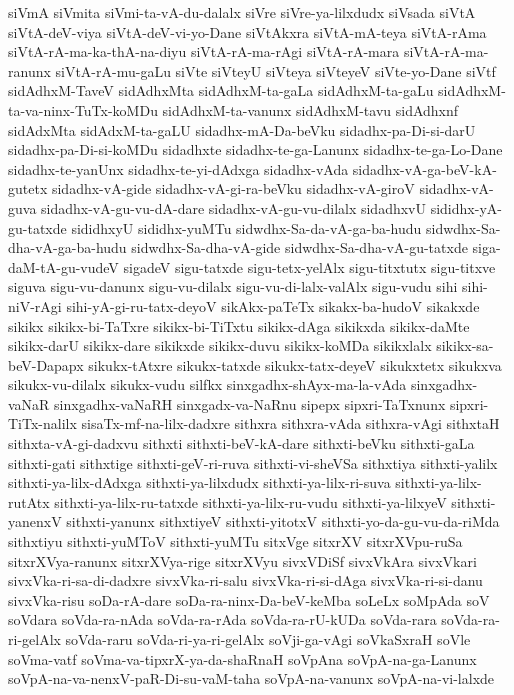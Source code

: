 {siVmA
siVmita
siVmi-ta-vA-du-dalalx
siVre
siVre-ya-lilxdudx
siVsada
siVtA
siVtA-deV-viya
siVtA-deV-vi-yo-Dane
siVtAkxra
siVtA-mA-teya
siVtA-rAma
siVtA-rA-ma-ka-thA-na-diyu
siVtA-rA-ma-rAgi
siVtA-rA-mara
siVtA-rA-ma-ranunx
siVtA-rA-mu-gaLu
siVte
siVteyU
siVteya
siVteyeV
siVte-yo-Dane
siVtf
sidAdhxM-TaveV
sidAdhxMta
sidAdhxM-ta-gaLa
sidAdhxM-ta-gaLu
sidAdhxM-ta-va-ninx-TuTx-koMDu
sidAdhxM-ta-vanunx
sidAdhxM-tavu
sidAdhxnf
sidAdxMta
sidAdxM-ta-gaLU
sidadhx-mA-Da-beVku
sidadhx-pa-Di-si-darU
sidadhx-pa-Di-si-koMDu
sidadhxte
sidadhx-te-ga-Lanunx
sidadhx-te-ga-Lo-Dane
sidadhx-te-yanUnx
sidadhx-te-yi-dAdxga
sidadhx-vAda
sidadhx-vA-ga-beV-kA-gutetx
sidadhx-vA-gide
sidadhx-vA-gi-ra-beVku
sidadhx-vA-giroV
sidadhx-vA-guva
sidadhx-vA-gu-vu-dA-dare
sidadhx-vA-gu-vu-dilalx
sidadhxvU
sididhx-yA-gu-tatxde
sididhxyU
sididhx-yuMTu
sidwdhx-Sa-da-vA-ga-ba-hudu
sidwdhx-Sa-dha-vA-ga-ba-hudu
sidwdhx-Sa-dha-vA-gide
sidwdhx-Sa-dha-vA-gu-tatxde
siga-daM-tA-gu-vudeV
sigadeV
sigu-tatxde
sigu-tetx-yelAlx
sigu-titxtutx
sigu-titxve
siguva
sigu-vu-danunx
sigu-vu-dilalx
sigu-vu-di-lalx-valAlx
sigu-vudu
sihi
sihi-niV-rAgi
sihi-yA-gi-ru-tatx-deyoV
sikAkx-paTeTx
sikakx-ba-hudoV
sikakxde
sikikx
sikikx-bi-TaTxre
sikikx-bi-TiTxtu
sikikx-dAga
sikikxda
sikikx-daMte
sikikx-darU
sikikx-dare
sikikxde
sikikx-duvu
sikikx-koMDa
sikikxlalx
sikikx-sa-beV-Dapapx
sikukx-tAtxre
sikukx-tatxde
sikukx-tatx-deyeV
sikukxtetx
sikukxva
sikukx-vu-dilalx
sikukx-vudu
silfkx
sinxgadhx-shAyx-ma-la-vAda
sinxgadhx-vaNaR
sinxgadhx-vaNaRH
sinxgadx-va-NaRnu
sipepx
sipxri-TaTxnunx
sipxri-TiTx-nalilx
sisaTx-mf-na-lilx-dadxre
sithxra
sithxra-vAda
sithxra-vAgi
sithxtaH
sithxta-vA-gi-dadxvu
sithxti
sithxti-beV-kA-dare
sithxti-beVku
sithxti-gaLa
sithxti-gati
sithxtige
sithxti-geV-ri-ruva
sithxti-vi-sheVSa
sithxtiya
sithxti-yalilx
sithxti-ya-lilx-dAdxga
sithxti-ya-lilxdudx
sithxti-ya-lilx-ri-suva
sithxti-ya-lilx-rutAtx
sithxti-ya-lilx-ru-tatxde
sithxti-ya-lilx-ru-vudu
sithxti-ya-lilxyeV
sithxti-yanenxV
sithxti-yanunx
sithxtiyeV
sithxti-yitotxV
sithxti-yo-da-gu-vu-da-riMda
sithxtiyu
sithxti-yuMToV
sithxti-yuMTu
sitxVge
sitxrXV
sitxrXVpu-ruSa
sitxrXVya-ranunx
sitxrXVya-rige
sitxrXVyu
sivxVDiSf
sivxVkAra
sivxVkari
sivxVka-ri-sa-di-dadxre
sivxVka-ri-salu
sivxVka-ri-si-dAga
sivxVka-ri-si-danu
sivxVka-risu
soDa-rA-dare
soDa-ra-ninx-Da-beV-keMba
soLeLx
soMpAda
soV
soVdara
soVda-ra-nAda
soVda-ra-rAda
soVda-ra-rU-kUDa
soVda-rara
soVda-ra-ri-gelAlx
soVda-raru
soVda-ri-ya-ri-gelAlx
soVji-ga-vAgi
soVkaSxraH
soVle
soVma-vatf
soVma-va-tipxrX-ya-da-shaRnaH
soVpAna
soVpA-na-ga-Lanunx
soVpA-na-va-nenxV-paR-Di-su-vaM-taha
soVpA-na-vanunx
soVpA-na-vi-lalxde
}
